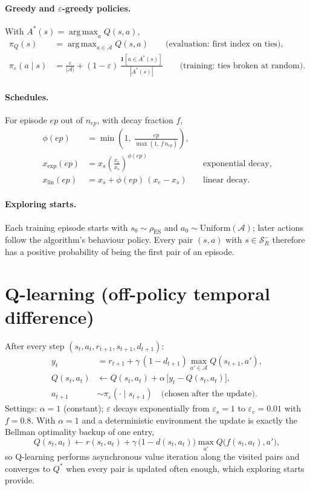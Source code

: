 \documentclass[11pt]{article}
\newcommand{\Sset}{\mathcal{S}}
\newcommand{\Aset}{\mathcal{A}}
\newcommand{\ind}[1]{\mathbf{1}\!\left[#1\right]}
\newcommand{\Qs}{Q^{*}}
\newcommand{\eps}{\varepsilon}
\DeclareMathOperator*{\argmax}{arg\,max}
\begin{document}
\paragraph{Greedy and $\eps$-greedy policies.} With $A^{*}(s)=\argmax_{a}Q(s,a)$,
\begin{align}
\pi_Q(s) &= \argmax_{a\in\Aset}Q(s,a) \qquad \text{(evaluation: first index on ties)},\\
\pi_{\eps}(a\mid s) &= \frac{\eps}{|\Aset|}+(1-\eps)\,\frac{\ind{a\in A^{*}(s)}}{|A^{*}(s)|} \qquad \text{(training: ties broken at random)}.
\end{align}

\paragraph{Schedules.} For episode $ep$ out of $n_{ep}$, with decay fraction $f$,
\begin{align}
\phi(ep) &= \min\!\left(1,\ \frac{ep}{\max(1,\,f\,n_{ep})}\right),\\
x_{\exp}(ep) &= x_s\left(\frac{x_e}{x_s}\right)^{\phi(ep)} && \text{exponential decay},\\
x_{\mathrm{lin}}(ep) &= x_s+\phi(ep)\,(x_e-x_s) && \text{linear decay}.
\end{align}

\paragraph{Exploring starts.} Each training episode starts with $s_0\sim\rho_{\mathrm{ES}}$ and $a_0\sim\mathrm{Uniform}(\Aset)$; later actions follow the algorithm's behaviour policy. Every pair $(s,a)$ with $s\in\Sset_R^{-}$ therefore has a positive probability of being the first pair of an episode.

\section{Q-learning (off-policy temporal difference)}
After every step $(s_t,a_t,r_{t+1},s_{t+1},d_{t+1})$:
\begin{align}
y_t &= r_{t+1}+\gamma\,(1-d_{t+1})\max_{a'\in\Aset}Q(s_{t+1},a'),\\
Q(s_t,a_t) &\leftarrow Q(s_t,a_t)+\alpha\,\big[y_t-Q(s_t,a_t)\big],\\
a_{t+1} &\sim \pi_{\eps}(\cdot\mid s_{t+1}) \quad\text{(chosen after the update)}.
\end{align}
Settings: $\alpha=1$ (constant); $\eps$ decays exponentially from $\eps_s=1$ to $\eps_e=0.01$ with $f=0.8$. With $\alpha=1$ and a deterministic environment the update is exactly the Bellman optimality backup of one entry,
\begin{equation}
Q(s_t,a_t)\leftarrow r(s_t,a_t)+\gamma\,\big(1-d(s_t,a_t)\big)\max_{a'}Q\big(f(s_t,a_t),a'\big),
\end{equation}
so Q-learning performs asynchronous value iteration along the visited pairs and converges to $\Qs$ when every pair is updated often enough, which exploring starts provide.
\end{document}
